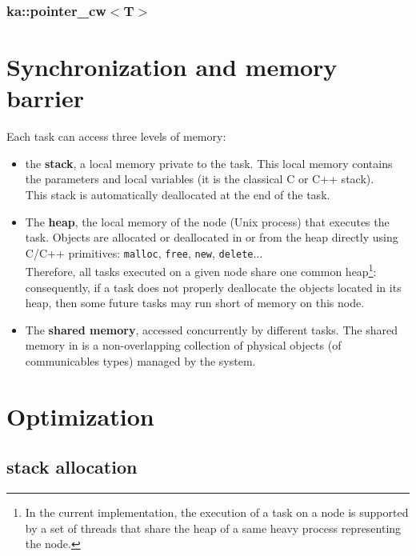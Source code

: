 \subsubsection{ka::pointer\_cw$<$T$>$ }

\section{Synchronization and memory barrier}

Each \kaapi task can access three levels of memory:
\begin{itemize}
\item
the \textbf{stack}, a local memory private to the task. This local
memory contains the parameters and local variables (it is the classical
C or C++ stack). \\
This stack is automatically deallocated at the end of the task.
\item
The \textbf{heap}, the  local memory of the node (Unix process) that executes
the task. Objects are allocated or deallocated in or from the heap directly
using C/C++ primitives:
\texttt{malloc}, \texttt{free}, \texttt{new}, \texttt{delete}... \\
Therefore, all tasks executed on a given node
share one common heap\footnote{In the current implementation, the
execution of a task on a node is supported by a set of threads that share the
heap of a same heavy process representing the node.}: consequently, if a task does not properly deallocate the objects
located in its heap,
then some future tasks may run short of memory on this node.

\item
The \textbf{shared memory}, accessed concurrently by different tasks.
The shared memory in \kaapi is a non-overlapping  collection of physical
objects (of communicables types) managed by the system.
\end{itemize}




\section{Optimization}

\subsection{\kaapi stack allocation}

